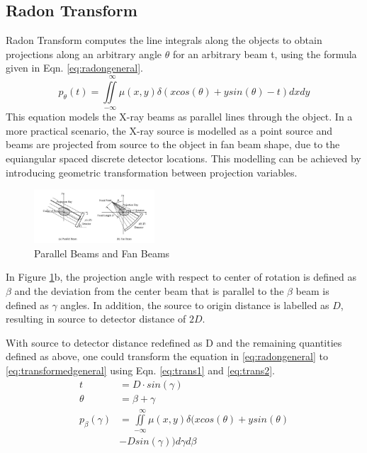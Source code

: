 \documentclass[journal]{IEEEtran}
\begin{document}
\subsection{Radon Transform}
Radon Transform computes the line integrals along the objects to obtain projections along an arbitrary angle $\theta$ for an arbitrary beam t, using the formula given in Eqn. \ref{eq:radongeneral}.
\begin{equation}
	p_{\theta}(t) = \iint\limits_{-\infty}^{\ \ \ \infty}\mu(x,y)\delta(xcos(\theta)+ysin(\theta)-t)dxdy
	\label{eq:radongeneral}
\end{equation}
This equation models the X-ray beams as parallel lines through the object. In a more practical scenario, the X-ray source is modelled as a point source and beams are projected from source to the object in fan beam shape, due to the equiangular spaced discrete detector locations. This modelling can be achieved by introducing geometric transformation between projection variables. 

\begin{figure}[h]
\centering
\includegraphics[width=0.4\textwidth]{images/PvsB.jpg}
\caption{Parallel Beams and Fan Beams \cite{zeng2017image}}\label{fig:PvsB}
\end{figure}

In Figure \ref{fig:PvsB}b, the projection angle with respect to center of rotation is defined as $\beta$ and the deviation from the center beam that is parallel to the $\beta$ beam is defined as $\gamma$ angles. In addition, the source to origin distance is labelled as $D$, resulting in source to detector distance of $2D$. 

With source to detector distance redefined as D and the remaining quantities defined as above, one could transform the equation in \ref{eq:radongeneral} to \ref{eq:transformedgeneral} using Eqn. \ref{eq:trans1} and \ref{eq:trans2}.
\begin{align}
	t &= D \cdot sin(\gamma) \label{eq:trans1} \\
	\theta &= \beta + \gamma \label{eq:trans2} \\
	p_{\beta}(\gamma) &= \iint\limits_{-\infty}^{\ \ \ \infty}\mu(x,y)\delta(xcos(\theta)+ysin(\theta) \label{eq:transformedgeneral} \\&-Dsin(\gamma))d\gamma d\beta \nonumber 
\end{align}
\end{document}
